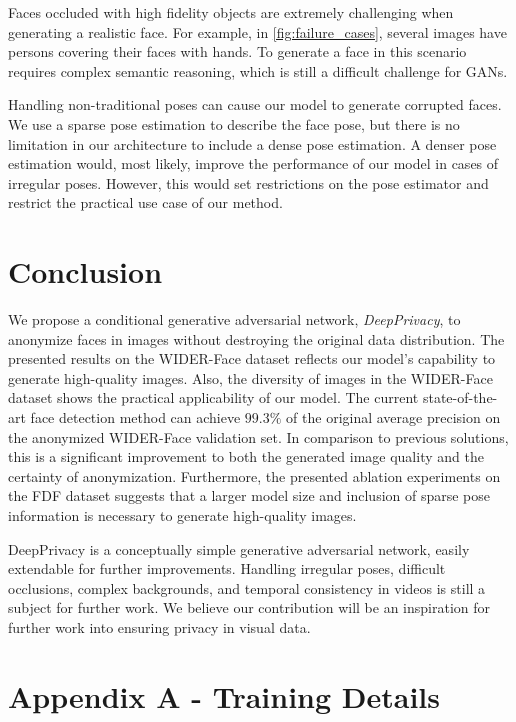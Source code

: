 \documentclass[runningheads]{llncs}
\begin{document}
Faces occluded with high fidelity objects are extremely challenging when generating a realistic face.
For example, in \autoref{fig:failure_cases}, several images have persons covering their faces with hands. To generate a face in this scenario requires complex semantic reasoning, which is still a difficult challenge for GANs. 

Handling non-traditional poses can cause our model to generate corrupted faces. We use a sparse pose estimation to describe the face pose, but there is no limitation in our architecture to include a dense pose estimation. A denser pose estimation would, most likely, improve the performance of our model in cases of irregular poses. However, this would set restrictions on the pose estimator and restrict the practical use case of our method.  \section{Conclusion}




We propose a conditional generative adversarial network, \textit{DeepPrivacy}, to anonymize faces in images without destroying the original data distribution. 
The presented results on the WIDER-Face dataset reflects our model's capability to generate high-quality images. Also, the diversity of images in the WIDER-Face dataset shows the practical applicability of our model. 
The current state-of-the-art face detection method can achieve $99.3\%$ of the original average precision on the anonymized WIDER-Face validation set. In comparison to previous solutions, this is a significant improvement to both the generated image quality and the certainty of anonymization. Furthermore, the presented ablation experiments on the FDF dataset suggests that a larger model size and inclusion of sparse pose information is necessary to generate high-quality images. 

DeepPrivacy is a conceptually simple generative adversarial network, easily extendable for further improvements. Handling irregular poses, difficult occlusions, complex backgrounds, and temporal consistency in videos is still a subject for further work. 
We believe our contribution will be an inspiration for further work into ensuring privacy in visual data.




 \section*{Appendix A - Training Details}
\end{document}
